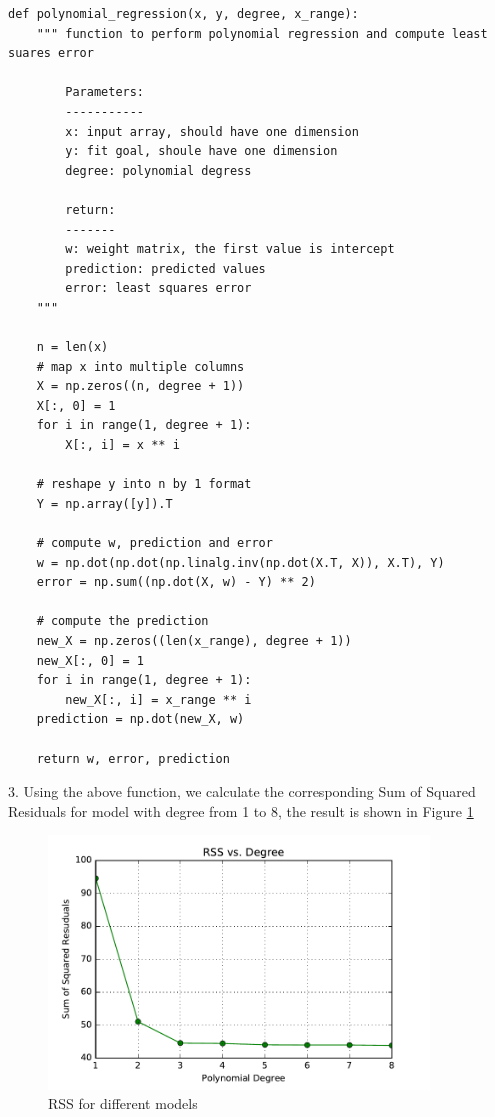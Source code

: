 \begin{description}
\begin{lstlisting}
def polynomial_regression(x, y, degree, x_range):
    """ function to perform polynomial regression and compute least suares error
        
        Parameters:
        -----------
        x: input array, should have one dimension 
        y: fit goal, shoule have one dimension
        degree: polynomial degress
        
        return:
        -------
        w: weight matrix, the first value is intercept
        prediction: predicted values
        error: least squares error
    """
    
    n = len(x)
    # map x into multiple columns
    X = np.zeros((n, degree + 1))
    X[:, 0] = 1
    for i in range(1, degree + 1):
        X[:, i] = x ** i
    
    # reshape y into n by 1 format
    Y = np.array([y]).T
    
    # compute w, prediction and error
    w = np.dot(np.dot(np.linalg.inv(np.dot(X.T, X)), X.T), Y)
    error = np.sum((np.dot(X, w) - Y) ** 2)
    
    # compute the prediction
    new_X = np.zeros((len(x_range), degree + 1))
    new_X[:, 0] = 1
    for i in range(1, degree + 1):
        new_X[:, i] = x_range ** i
    prediction = np.dot(new_X, w)
    
    return w, error, prediction
\end{lstlisting}


\item{3. }
Using the above function, we calculate the corresponding Sum of Squared Residuals for model with degree from 1 to 8, the result is shown in Figure \ref{fig:RSS}
\begin{figure}[H]
\centering
\includegraphics[width=0.9\textwidth]{./figures/rss.pdf}
\caption{\label{fig:RSS} RSS for different models}
\end{figure}
 

\end{description}
